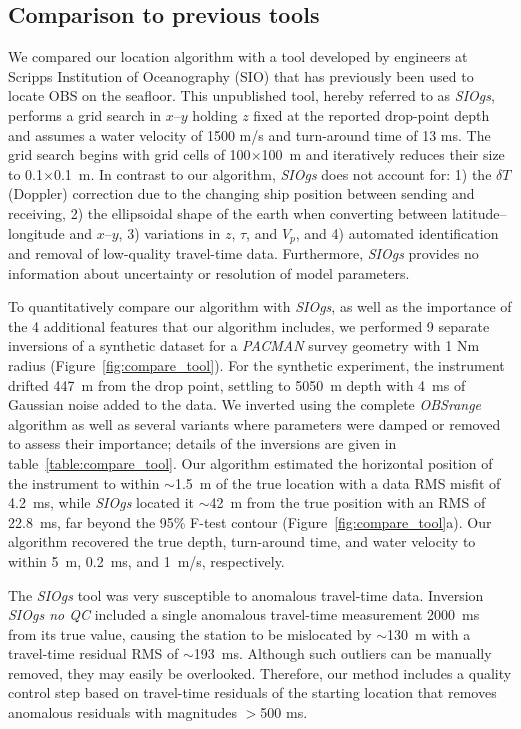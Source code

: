 \subsection{Comparison to previous tools}

We compared our location algorithm with a tool developed by engineers at Scripps Institution of Oceanography (SIO) that has previously been used to locate OBS on the seafloor. This unpublished tool, hereby referred to as \textit{SIOgs}, performs a grid search in $x$--$y$ holding $z$ fixed at the reported drop-point depth and assumes a water velocity of 1500 m/s and turn-around time of 13 ms. The grid search begins with grid cells of 100$\times$100~m and iteratively reduces their size to 0.1$\times$0.1~m. In contrast to our algorithm, \textit{SIOgs} does not account for: 1) the $\delta T$ (Doppler) correction due to the changing ship position between sending and receiving, 2) the ellipsoidal shape of the earth when converting between latitude--longitude and $x$--$y$, 3) variations in $z$, $\tau$, and $V_p$, and 4) automated identification and removal of low-quality travel-time data. Furthermore, \textit{SIOgs} provides no information about uncertainty or resolution of model parameters.  

To quantitatively compare our algorithm with \textit{SIOgs}, as well as the importance of the 4 additional features that our algorithm includes, we performed 9 separate inversions of a synthetic dataset for a \textit{PACMAN} survey geometry with 1 Nm radius (Figure~\ref{fig:compare_tool}). For the synthetic experiment, the instrument drifted 447~m from the drop point, settling to 5050~m depth with 4~ms of Gaussian noise added to the data. We inverted using the complete \textit{OBSrange} algorithm as well as several variants where parameters were damped or removed to assess their importance; details of the inversions are given in table~\ref{table:compare_tool}. Our algorithm estimated the horizontal position of the instrument to within $\sim$1.5~m of the true location with a data RMS misfit of 4.2~ms, while \textit{SIOgs} located it $\sim$42~m from the true position with an RMS of 22.8~ms, far beyond the 95\% F-test contour (Figure~\ref{fig:compare_tool}a). Our algorithm recovered the true depth, turn-around time, and water velocity to within 5~m, 0.2~ms, and 1~m/s, respectively.

The \textit{SIOgs} tool was very susceptible to anomalous travel-time data. Inversion \textit{SIOgs no QC} included a single anomalous travel-time measurement 2000~ms from its true value, causing the station to be mislocated by $\sim$130~m with a travel-time residual RMS of $\sim$193~ms. Although such outliers can be manually removed, they may easily be overlooked. Therefore, our method includes a quality control step based on travel-time residuals of the starting location that removes anomalous residuals with magnitudes $>$500 ms.

